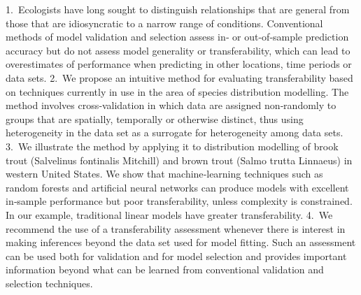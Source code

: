 1. Ecologists have long sought to distinguish relationships that are general from those that are idiosyncratic to a narrow range of conditions. Conventional methods of model validation and selection assess in‐ or out‐of‐sample prediction accuracy but do not assess model generality or transferability, which can lead to overestimates of performance when predicting in other locations, time periods or data sets. 2. We propose an intuitive method for evaluating transferability based on techniques currently in use in the area of species distribution modelling. The method involves cross‐validation in which data are assigned non‐randomly to groups that are spatially, temporally or otherwise distinct, thus using heterogeneity in the data set as a surrogate for heterogeneity among data sets. 3. We illustrate the method by applying it to distribution modelling of brook trout (Salvelinus fontinalis Mitchill) and brown trout (Salmo trutta Linnaeus) in western United States. We show that machine‐learning techniques such as random forests and artificial neural networks can produce models with excellent in‐sample performance but poor transferability, unless complexity is constrained. In our example, traditional linear models have greater transferability. 4. We recommend the use of a transferability assessment whenever there is interest in making inferences beyond the data set used for model fitting. Such an assessment can be used both for validation and for model selection and provides important information beyond what can be learned from conventional validation and selection techniques.
